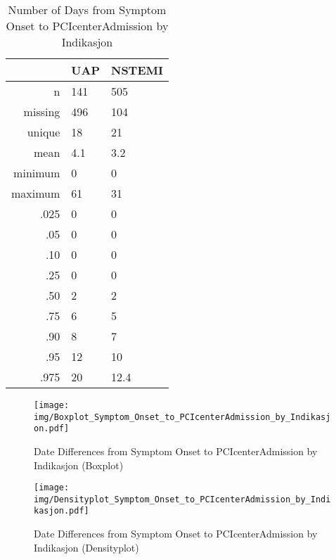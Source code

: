 \documentclass[a4paper]{report}
\begin{document}
\begin{itemize}
{%
\begin{table}[ht]
\centering
\begin{tabular}{rll}
  \toprule
 & UAP & NSTEMI \\ 
  \midrule
n & 141 & 505 \\ 
  missing & 496 & 104 \\ 
  unique & 18 & 21 \\ 
  mean & 4.1 & 3.2 \\ 
  minimum & 0 & 0 \\ 
  maximum & 61 & 31 \\ 
  .025 & 0 & 0 \\ 
  .05 & 0 & 0 \\ 
  .10 & 0 & 0 \\ 
  .25 & 0 & 0 \\ 
  .50 & 2 & 2 \\ 
  .75 & 6 & 5 \\ 
  .90 & 8 & 7 \\ 
  .95 & 12 & 10 \\ 
  .975 & 20 & 12.4 \\ 
   \bottomrule
\end{tabular}
\caption{Number of Days from Symptom Onset to PCIcenterAdmission by Indikasjon} 
\end{table}
\begin{figure}
  \centering
  \caption{Date Differences from Symptom Onset to PCIcenterAdmission by Indikasjon (Boxplot)}
  \label{Boxplot: Date Differences from Symptom Onset to PCIcenterAdmission by Indikasjon}
\texttt{[image: img/Boxplot\_Symptom\_Onset\_to\_PCIcenterAdmission\_by\_Indikasjon.pdf]}\end{figure}


\begin{figure}
  \centering
  \caption{Date Differences from Symptom Onset to PCIcenterAdmission by Indikasjon (Densityplot)}
  \label{Density: Date Differences from Symptom Onset to PCIcenterAdmission by Indikasjon}
\texttt{[image: img/Densityplot\_Symptom\_Onset\_to\_PCIcenterAdmission\_by\_Indikasjon.pdf]}\end{figure}


\clearpage

}
\end{itemize}
\end{document}
